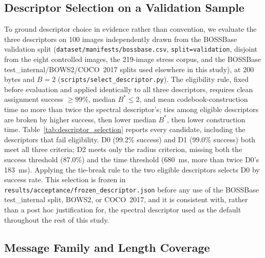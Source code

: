 \documentclass[preprint,12pt]{elsarticle}
\theoremstyle{plain}
\begin{document}
\subsection{Descriptor Selection on a Validation Sample}

To ground descriptor choice in evidence rather than convention, we evaluate
the three descriptors on 100 images independently drawn from the BOSSBase
validation split (\texttt{dataset/manifests/bossbase.csv}, \texttt{split=validation},
disjoint from the eight controlled images, the 219-image stress corpus, and
the BOSSBase test\_internal/BOWS2/COCO~2017 splits used elsewhere in this
study), at 200 bytes and $B=2$ (\texttt{scripts/select\_descriptor.py}). The
eligibility rule, fixed before evaluation and applied identically to all
three descriptors, requires clean assignment success $\geq99\%$,
median $B^\ast\leq2$, and mean codebook-construction time no more than twice
the spectral descriptor's; ties among eligible descriptors are broken by
higher success, then lower median $B^\ast$, then lower construction time.
Table~\ref{tab:descriptor_selection} reports every candidate, including the
descriptors that fail eligibility. D0 (99.2\% success) and D1 (99.0\% success)
both meet all three criteria; D2 meets only the radius criterion, missing
both the success threshold (87.0\%) and the time threshold (680~ms, more than
twice D0's 183~ms). Applying the tie-break rule to the two eligible
descriptors selects D0 by success rate. This selection is frozen in
\texttt{results/acceptance/frozen\_descriptor.json} before any use of the
BOSSBase test\_internal split, BOWS2, or COCO~2017, and it is consistent with,
rather than a post hoc justification for, the spectral descriptor used as the
default throughout the rest of this study.

\begin{table}[!t]
\centering
\caption{Descriptor Selection on 100 BOSSBase Validation Images (200 Bytes, $B=2$)}
\label{tab:descriptor_selection}

\end{table}

\subsection{Message Family and Length Coverage}
\end{document}
